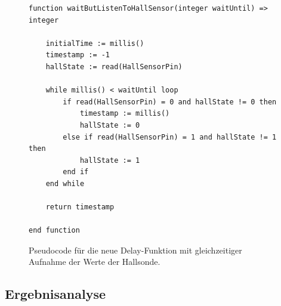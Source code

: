 \documentclass{kis}
\begin{document}
\begin{figure}
\lstset{basicstyle=\small\ttfamily,tabsize=3}
{\singlespacing
\begin{lstlisting}[frame=single]
function waitButListenToHallSensor(integer waitUntil) => integer
	
	initialTime := millis()
	timestamp := -1
	hallState := read(HallSensorPin)
	
	while millis() < waitUntil loop
		if read(HallSensorPin) = 0 and hallState != 0 then
			timestamp := millis()
			hallState := 0
		else if read(HallSensorPin) = 1 and hallState != 1 then
			hallState := 1
		end if
	end while
	
	return timestamp
	
end function
\end{lstlisting}
}
\caption{Pseudocode für die neue Delay-Funktion mit gleichzeitiger Aufnahme der Werte der Hallsonde.}
\label{fig:pseudo-delay}
\end{figure}


\subsection{Ergebnisanalyse}

\appendix
\end{document}
